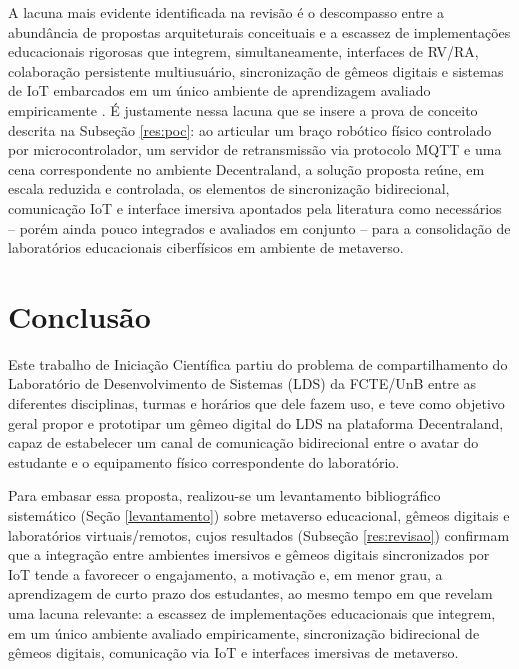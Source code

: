 \documentclass[12pt]{article}
\begin{document}
A lacuna mais evidente identificada na revisão é o descompasso entre a abundância de propostas arquiteturais conceituais e a escassez de implementações educacionais rigorosas que integrem, simultaneamente, interfaces de RV/RA, colaboração persistente multiusuário, sincronização de gêmeos digitais e sistemas de IoT embarcados em um único ambiente de aprendizagem avaliado empiricamente \cite{Xiao2025Industrial, Tu2024Architecture, Popov2024MetaverseBased}. É justamente nessa lacuna que se insere a prova de conceito descrita na Subseção \ref{res:poc}: ao articular um braço robótico físico controlado por microcontrolador, um servidor de retransmissão via protocolo MQTT e uma cena correspondente no ambiente Decentraland, a solução proposta reúne, em escala reduzida e controlada, os elementos de sincronização bidirecional, comunicação IoT e interface imersiva apontados pela literatura como necessários -- porém ainda pouco integrados e avaliados em conjunto -- para a consolidação de laboratórios educacionais ciberfísicos em ambiente de metaverso.

\section{Conclusão}
 
Este trabalho de Iniciação Científica partiu do problema de compartilhamento do Laboratório de Desenvolvimento de Sistemas (LDS) da FCTE/UnB entre as diferentes disciplinas, turmas e horários que dele fazem uso, e teve como objetivo geral propor e prototipar um gêmeo digital do LDS na plataforma Decentraland, capaz de estabelecer um canal de comunicação bidirecional entre o avatar do estudante e o equipamento físico correspondente do laboratório.
 
Para embasar essa proposta, realizou-se um levantamento bibliográfico sistemático (Seção \ref{levantamento}) sobre metaverso educacional, gêmeos digitais e laboratórios virtuais/remotos, cujos resultados (Subseção \ref{res:revisao}) confirmam que a integração entre ambientes imersivos e gêmeos digitais sincronizados por IoT tende a favorecer o engajamento, a motivação e, em menor grau, a aprendizagem de curto prazo dos estudantes, ao mesmo tempo em que revelam uma lacuna relevante: a escassez de implementações educacionais que integrem, em um único ambiente avaliado empiricamente, sincronização bidirecional de gêmeos digitais, comunicação via IoT e interfaces imersivas de metaverso.
 
\end{document}
